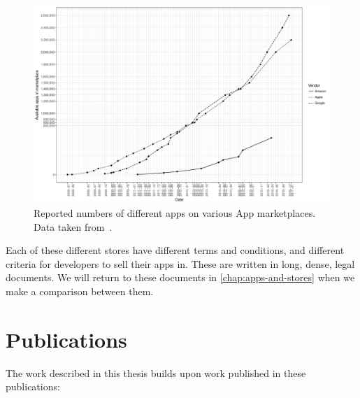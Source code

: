 \documentclass[thesis.tex]{subfiles}
\begin{document}
\begin{figure}
  \includegraphics[width=\textwidth]{figures/app-store-apps.pdf}
  \caption[Reported numbers of different apps on various App marketplaces.]{%
    Reported numbers of different apps on various App marketplaces. Data taken from~\cite{statista_google_nodate,statista_apple_nodate,statista_amazon_nodate}.}
  \label{fig:app-store-apps}
\end{figure}

Each of these different stores have different terms and conditions,
and different criteria for developers to sell their apps in. These
are written in long, dense, legal documents. We will return to these
documents in \autoref{chap:apps-and-stores} when we make a
comparison between them.


\section{Publications}

The work described in this thesis builds upon work published in these publications:
\end{document}
